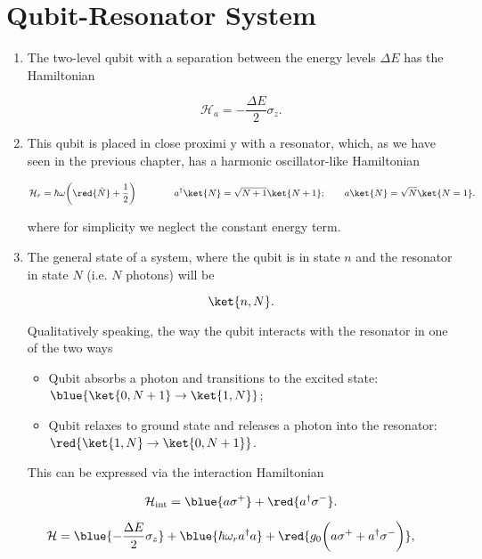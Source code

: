 
\section{Qubit-Resonator System \cite{cqeResonator}}
\begin{enumerate}
\item The  two-level qubit with  a separation between the  energy levels
  $ \Delta E $ has the Hamiltonian

\begin{equation}
  \mathcal{H}_{a}= -\frac{\Delta E}{2}\sigma_z.
  \label{qrA}
\end{equation}

\item This qubit  is placed in close proximi y  with a resonator, which,
  as   we  have   seen  in   the  previous   chapter,  has   a  harmonic
  oscillator-like Hamiltonian

\begin{equation}
  \mathcal{H}_{r}={\hbar\omega}\bigg(\red{\hat{N}}+\frac{1}{2}\bigg)\qquad \qquad a^{\dagger}\ket{N}=\sqrt{N+1}\ket{N+1}; \qquad a\ket{N}=\sqrt{N}\ket{N=1}.
  \label{qrR}
\end{equation}

\noindent where for simplicity we neglect the constant energy term.

\item The general state  of a system, where the qubit is in  state $ n $
  and the resonator in state $ N $ (i.e.  $ N $ photons) will be

\begin{equation}
  \ket{n,N}.
\end{equation}

\noindent Qualitatively speaking,  the way the qubit  interacts with the
resonator in one of the two ways

\begin{itemize}
\item  Qubit absorbs  a photon  and  transitions to  the excited  state:
  $ \blue{\ket{0,N+1} \rightarrow \ket{1,N}} $;
\item  Qubit relaxes  to ground  state and  releases a  photon into  the
  resonator: $ \red{\ket{1,N} \rightarrow \ket{0,N+1}} $.
\end{itemize}

This can be expressed via the interaction Hamiltonian

\begin{equation}
  \mathcal{H}_{\text{int}}=\blue{a\sigma^+}+\red{a^{\dagger}\sigma^-}.
  \label{qrInt}
\end{equation}
\end{enumerate}
\begin{framed}\noindent
  \LARGE
  \[                     \mathcal{H}                     =\blue{-\frac{\Delta
        E}{2}\sigma_z}+\blue{{\hbar\omega_r}a^\dagger        a}        +
    \red{g_0\bigg({a\sigma^+}+{a^{\dagger}\sigma^-}\bigg)},
  \]
\end{framed}

